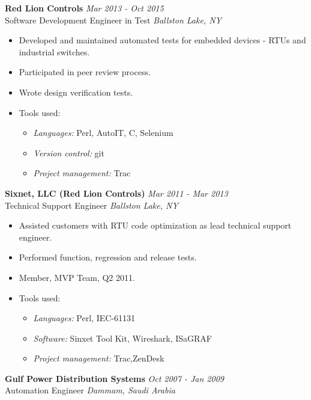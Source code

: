 \documentclass{article}
\begin{document}
    {\bf Red Lion Controls} \hfill {\em Mar 2013 - Oct 2015} \\
    Software Development Engineer in Test \hfill {\em Ballston Lake, NY} \\
    \begin{itemize}
    \item Developed and maintained automated tests for embedded devices - 
          RTUs and industrial switches.
    \item Participated in peer review process.
    \item Wrote design verification tests.
    \item Tools used:
          \begin{itemize}
          \item {\it Languages:} Perl, AutoIT, C, Selenium
          \item {\it Version control:} git
          \item {\it Project management:} Trac
          \end{itemize}
    \end{itemize}
    \smallskip

    {\bf Sixnet, LLC (Red Lion Controls)} \hfill {\em Mar 2011 - Mar 2013} \\
    Technical Support Engineer \hfill {\em Ballston Lake, NY} \\
    \begin{itemize}
    \item Assisted customers with RTU code optimization as lead technical
          support engineer.
    \item Performed function, regression and release tests.
    \item Member, MVP Team, Q2 2011.
    \item Tools used:
          \begin{itemize}
          \item {\it Languages:} Perl, IEC-61131
          \item {\it Software:} Sinxet Tool Kit, Wireshark, ISaGRAF
          \item {\it Project management:} Trac,ZenDesk
          \end{itemize}
    \end{itemize}
    \smallskip

    {\bf Gulf Power Distribution Systems} \hfill {\em Oct 2007 - Jan 2009} \\
    Automation Engineer \hfill {\em Dammam, Saudi Arabia} \\
    \smallskip
\end{document}
